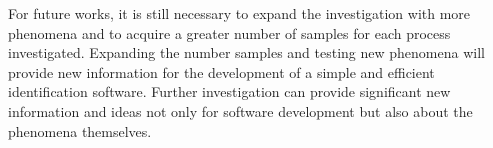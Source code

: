 For future works, it is still necessary to expand the investigation with more
phenomena and to acquire a greater number of samples for each process
investigated. Expanding the number samples and testing new phenomena will
provide new information for the development of a simple and efficient
identification software. Further investigation can provide significant new
information and ideas not only for software development but also about the
phenomena themselves.





